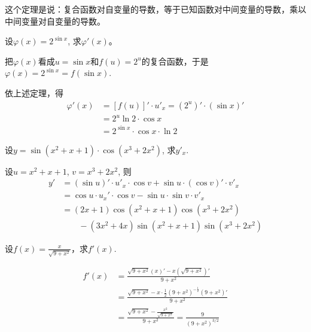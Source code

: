 这个定理是说：复合函数对自变量的导数，等于已知函数对中间变量的导数，乘以中间变量对自变量的导数。


\begin{example}
    设$\varphi (x)=2^{\sin x}$, 求$\varphi'(x)$。
\end{example}

    
\begin{solution}
    把$\varphi (x)$看成$u=\sin x$和$f(u)=2^u$的复合函数，于是$\varphi  (x) =2^{\sin x}=f (\sin x)$.

依上述定理，得
\[\begin{split}
  \varphi' (x) &= [f (u) ]'\cdot u'_x= (2^u)'\cdot (\sin x)'\\
&=2^u\ln2 \cdot \cos x\\
&=2^{\sin x}\cdot \cos x \cdot \ln2  
\end{split}\]
\end{solution}

\begin{example}
    设$y=\sin(x^2+x+1)\cdot \cos(x^3+2x^2)$, 求$y'_x$.
\end{example}

\begin{solution}
    设$u=x^2+x+1$, $v=x^3+2x^2$, 则
\[\begin{split}
  y'&= (\sin u)'\cdot u'_x\cdot \cos v+\sin u\cdot (\cos v)'\cdot v'_x\\
&=\cos u\cdot u_x'\cdot \cos v-\sin u\cdot \sin v\cdot  v'_x\\
&= (2x+1) \cos (x^2+x+1) \cos (x^3+2x^2)\\
&\qquad - (3x^2+4x) \sin (x^2+x+1) \sin (x^3+2x^2)  
\end{split}\]
\end{solution}
    
\begin{example}
设$f(x)=\frac{x}{\sqrt{9+x^2}}$，求$f'(x)$.
\end{example}


\begin{solution}
\[\begin{split}
    f'(x)&=\frac{\sqrt{9+x^2}(x)'-x\left(\sqrt{9+x^2}\right)'}{9+x^2}\\
    &=\frac{\sqrt{9+x^2}-x\cdot \frac{1}{2}(9+x^2)^{-\tfrac{1}{2}}(9+x^2)'}{9+x^2}\\
    &=\frac{\sqrt{9+x^2}-\frac{x^2}{\sqrt{9+x^2}}}{9+x^2}=\frac{9}{\left(9+x^2\right)^{3/2}}
\end{split}\]
\end{solution}
    
